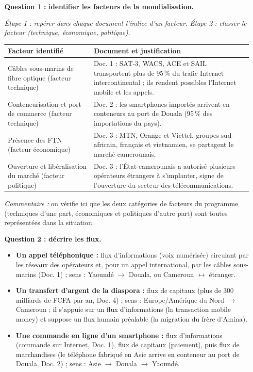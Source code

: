 \documentclass[11pt]{article}
\begin{document}
\begin{exoresolu}
\textbf{Question 1 : identifier les facteurs de la mondialisation.}

\emph{Étape 1 : repérer dans chaque document l'indice d'un facteur. Étape 2 : classer le facteur (technique, économique, politique).}

\begin{center}
\begin{tabularx}{\linewidth}{|l|X|}\hline
\rowcolor{popblueL} \textbf{Facteur identifié} & \textbf{Document et justification} \\ \hline
Câbles sous-marins de fibre optique (facteur technique) & Doc. 1 : SAT-3, WACS, ACE et SAIL transportent plus de 95\,\% du trafic Internet intercontinental ; ils rendent possibles l'Internet mobile et les appels. \\ \hline
Conteneurisation et port de commerce (facteur technique) & Doc. 2 : les smartphones importés arrivent en conteneurs au port de Douala (95\,\% des importations du pays). \\ \hline
Présence des FTN (facteur économique) & Doc. 3 : MTN, Orange et Viettel, groupes sud-africain, français et vietnamien, se partagent le marché camerounais. \\ \hline
Ouverture et libéralisation du marché (facteur politique) & Doc. 3 : l'État camerounais a autorisé plusieurs opérateurs étrangers à s'implanter, signe de l'ouverture du secteur des télécommunications. \\ \hline
\end{tabularx}
\end{center}

\emph{Commentaire :} on vérifie ici que les deux catégories de facteurs du programme (techniques d'une part, économiques et politiques d'autre part) sont toutes représentées dans la situation.

\tcblower

\textbf{Question 2 : décrire les flux.}

\begin{itemize}
\item \textbf{Un appel téléphonique :} flux d'informations (voix numérisée) circulant par les réseaux des opérateurs et, pour un appel international, par les câbles sous-marins (Doc. 1) ; sens : Yaoundé $\rightarrow$ Douala, ou Cameroun $\leftrightarrow$ étranger.
\item \textbf{Un transfert d'argent de la diaspora :} flux de capitaux (plus de 300 milliards de FCFA par an, Doc. 4) ; sens : Europe/Amérique du Nord $\rightarrow$ Cameroun ; il s'appuie sur un flux d'informations (la transaction mobile money) et suppose un flux humain préalable (la migration du frère d'Amina).
\item \textbf{Une commande en ligne d'un smartphone :} flux d'informations (commande sur Internet, Doc. 1), flux de capitaux (paiement), puis flux de marchandises (le téléphone fabriqué en Asie arrive en conteneur au port de Douala, Doc. 2) ; sens : Asie $\rightarrow$ Douala $\rightarrow$ Yaoundé.
\end{itemize}


\end{exoresolu}
\end{document}
